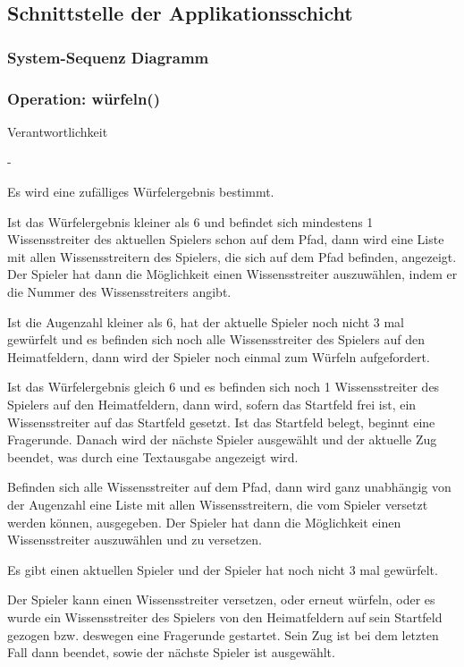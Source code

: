 \subsection{Schnittstelle der Applikationsschicht}

\subsubsection{System-Sequenz Diagramm}

\subsubsection{Operation: würfeln()}
\begin{labeling}[:]{Verantwortlichkeit}
\item [Parameter] -
\item [Verantwortlichkeit] Es wird eine zufälliges Würfelergebnis bestimmt. 

Ist das Würfelergebnis kleiner als 6 und befindet sich mindestens 1 Wissensstreiter des aktuellen Spielers schon auf dem Pfad, dann wird eine Liste mit allen Wissensstreitern des Spielers, die sich auf dem Pfad befinden, angezeigt. Der Spieler hat dann die Möglichkeit einen Wissensstreiter auszuwählen, indem er die Nummer des Wissensstreiters angibt.

Ist die Augenzahl kleiner als 6, hat der aktuelle Spieler noch nicht 3 mal gewürfelt und es befinden sich noch alle Wissensstreiter des Spielers auf den Heimatfeldern, dann wird der Spieler noch einmal zum Würfeln aufgefordert.

Ist das Würfelergebnis gleich 6 und es befinden sich noch 1 Wissensstreiter des Spielers auf den Heimatfeldern, dann wird, sofern das Startfeld frei ist, ein Wissensstreiter auf das Startfeld gesetzt. Ist das Startfeld belegt, beginnt eine Fragerunde. Danach wird der nächste Spieler ausgewählt und der aktuelle Zug beendet, was durch eine Textausgabe angezeigt wird.

Befinden sich alle Wissensstreiter auf dem Pfad, dann wird ganz unabhängig von der Augenzahl eine Liste mit allen Wissensstreitern, die vom Spieler versetzt werden können, ausgegeben.
Der Spieler hat dann die Möglichkeit einen Wissensstreiter auszuwählen und zu versetzen.
\item [Ausnahmen]
\item [Vorbedingungen] Es gibt einen aktuellen Spieler und der Spieler hat noch nicht 3 mal gewürfelt.
\item [Nachbedingungen] Der Spieler kann einen Wissensstreiter versetzen, oder erneut würfeln, oder es wurde ein Wissensstreiter des Spielers von den Heimatfeldern auf sein Startfeld gezogen bzw. deswegen eine Fragerunde gestartet. Sein Zug ist bei dem letzten Fall dann beendet, sowie der nächste Spieler ist ausgewählt.
\end{labeling}

